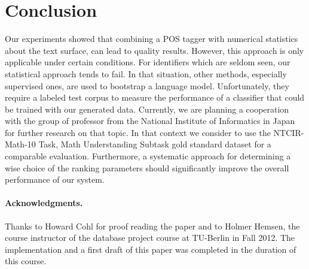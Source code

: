 \documentclass[runningheads]{llncs}
\begin{document}
\section{Conclusion}
Our experiments showed that combining a POS tagger with numerical statistics
about the text surface, can lead to quality results.
However, this approach is
only applicable under certain conditions. 
For identifiers which
are seldom seen, our statistical approach tends to fail.
In that situation, other methods, especially supervised ones, are used to
bootstrap a language model.
Unfortunately, they require a labeled test
corpus to measure the performance of a classifier that could be trained with our generated data.
Currently, we are planning a cooperation with the group of professor \citeauthor{Aizawa2013} from the National Institute of Informatics in Japan for further research on that topic. In that context we consider to use the NTCIR-Math-10 Task, Math Understanding Subtask gold standard dataset \cite{Aizawa2013} for a comparable evaluation.
Furthermore, a systematic approach for determining a wise choice of the ranking parameters should significantly improve the overall performance of our system.
\paragraph*{Acknowledgments.}
Thanks to Howard Cohl for proof reading the paper and to Holmer Hemsen, the course instructor of the database project course at TU-Berlin in Fall 2012. The implementation and a first draft of this paper was completed in the duration of this course.


\begingroup
\let\clearpage\relax

\endgroup
\end{document}
